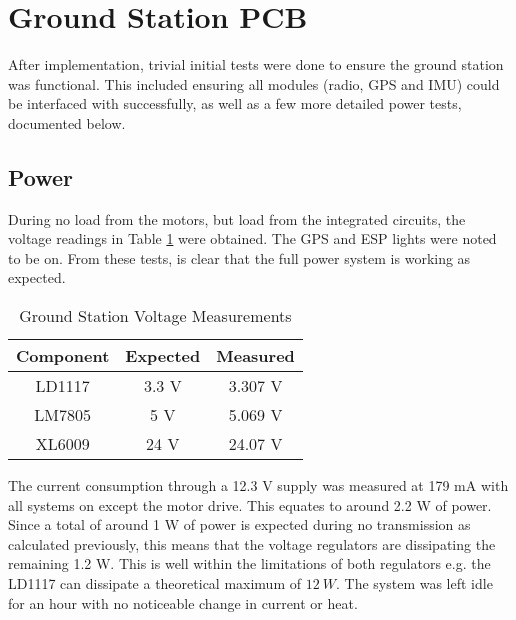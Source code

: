 \section{Ground Station PCB}

After implementation, trivial initial tests were done to ensure the ground station was functional. This included ensuring all modules (radio, GPS and IMU) could be interfaced with successfully, as well as a few more detailed power tests, documented below.

\subsection{Power}

During no load from the motors, but load from the integrated circuits, the voltage readings in Table \ref{tab:gs_pcb_voltage} were obtained. The GPS and ESP lights were noted to be on. From these tests, is clear that the full power system is working as expected.
\begin{table}[!htb]
  \centering
  \renewcommand{\arraystretch}{1.2}
  \begin{tabular}{ |c|c|c| }
  \hline
  \textbf{Component}        & \textbf{Expected}     & \textbf{Measured}  \\
  \hline
  LD1117                 &  3.3 V             & 3.307 V \\  \hline
  LM7805                 &  5 V               & 5.069 V \\  \hline
  XL6009                 &  24 V             & 24.07 V  \\ \hline
  \end{tabular}
  \caption{Ground Station Voltage Measurements}
  \label{tab:gs_pcb_voltage}
\end{table}

The current consumption through a 12.3 V supply was measured at 179 mA with all systems on except the motor drive. This equates to around 2.2 W of power. Since a total of around 1 W of power is expected during no transmission as calculated previously, this means that the voltage regulators are dissipating the remaining 1.2 W. This is well within the limitations of both regulators e.g. the LD1117 can dissipate a theoretical maximum of $\SI{12}{W}$. The system was left idle for an hour with no noticeable change in current or heat.

